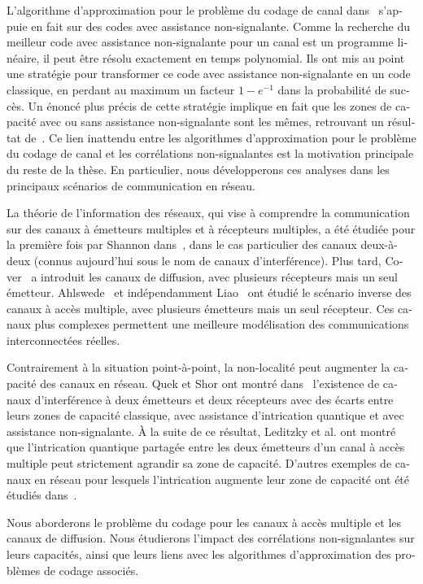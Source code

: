 \begin{otherlanguage}{french}
L'algorithme d'approximation pour le problème du codage de canal dans~\cite{BF18} s'appuie en fait sur des codes avec assistance non-signalante. Comme la recherche du meilleur code avec assistance non-signalante pour un canal est un programme linéaire, il peut être résolu exactement en temps polynomial. Ils ont mis au point une stratégie pour transformer ce code avec assistance non-signalante en un code classique, en perdant au maximum un facteur $1-e^{-1}$ dans la probabilité de succès. Un énoncé plus précis de cette stratégie implique en fait que les zones de capacité avec ou sans assistance non-signalante sont les mêmes, retrouvant un résultat de~\cite{Matthews12}. Ce lien inattendu entre les algorithmes d'approximation pour le problème du codage de canal et les corrélations non-signalantes est la motivation principale du reste de la thèse. En particulier, nous développerons ces analyses dans les principaux scénarios de communication en réseau.

La théorie de l'information des réseaux, qui vise à comprendre la communication sur des canaux à émetteurs multiples et à récepteurs multiples, a été étudiée pour la première fois par Shannon dans~\cite{Shannon61}, dans le cas particulier des canaux deux-à-deux (connus aujourd'hui sous le nom de canaux d'interférence). Plus tard, Cover~\cite{Cover72} a introduit les canaux de diffusion, avec plusieurs récepteurs mais un seul émetteur. Ahlswede~\cite{Ahlswede73} et indépendamment Liao~\cite{Liao73} ont étudié le scénario inverse des canaux à accès multiple, avec plusieurs émetteurs mais un seul récepteur. Ces canaux plus complexes permettent une meilleure modélisation des communications interconnectées réelles.

Contrairement à la situation point-à-point, la non-localité peut augmenter la capacité des canaux en réseau. Quek et Shor ont montré dans~\cite{QS17} l'existence de canaux d'interférence à deux émetteurs et deux récepteurs avec des écarts entre leurs zones de capacité classique, avec assistance d'intrication quantique et avec assistance non-signalante. À la suite de ce résultat, Leditzky et al. ont montré que l'intrication quantique partagée entre les deux émetteurs d'un canal à accès multiple peut strictement agrandir sa zone de capacité. D'autres exemples de canaux en réseau pour lesquels l'intrication augmente leur zone de capacité ont été étudiés dans~\cite{Noetzel20,ND20}.

Nous aborderons le problème du codage pour les canaux à accès multiple et les canaux de diffusion. Nous étudierons l'impact des corrélations non-signalantes sur leurs capacités, ainsi que leurs liens avec les algorithmes d'approximation des problèmes de codage associés.


\end{otherlanguage}
